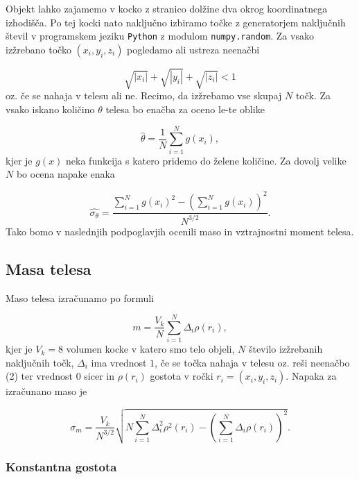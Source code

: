 \documentclass[slovene,11pt,a4paper]{article}
\begin{document}
Objekt lahko zajamemo v kocko z stranico dolžine dva okrog koordinatnega izhodišča. Po tej kocki nato naključno izbiramo točke z generatorjem naključnih števil v programskem jeziku \texttt{Python} z modulom \texttt{numpy.random}. Za vsako izžrebano točko $(x_i, y_i, z_i)$ pogledamo ali ustreza neenačbi

\begin{equation}
\sqrt{|x_i|} + \sqrt{|y_i|} + \sqrt{|z_i|} < 1
\end{equation}
oz. če se nahaja v telesu ali ne. Recimo, da izžrebamo vse skupaj $N$ točk. Za vsako iskano količino $\theta$ telesa bo enačba za oceno le-te oblike

\begin{equation}
\hat{\theta} = \frac{1}{N} \sum_{i=1}^N g(x_i),
\end{equation}
kjer je $g(x)$ neka funkcija s katero pridemo do želene količine. Za dovolj velike $N$ bo ocena napake enaka

\begin{equation}
\hat{\sigma_{\theta}} = \frac{\sum_{i=1}^N g(x_i)^2 - \left( \sum_{i=1}^N g(x_i) \right)^2}{N^{3/2}}.
\end{equation}
Tako bomo v naslednjih podpoglavjih ocenili maso in vztrajnostni moment telesa.

\subsection{Masa telesa}

Maso telesa izračunamo po formuli

\begin{equation}
m = \frac{V_k}{N} \sum_{i=1}^N \Delta_i \rho(r_i),
\end{equation}
kjer je $V_k = 8$ volumen kocke v katero smo telo objeli, $N$ število izžrebanih naključnih točk, $\Delta_i$ ima vrednost $1$, če se točka nahaja v telesu oz. reši neenačbo (2) ter vrednost $0$ sicer in $\rho(r_i)$ gostota v ročki $r_i = (x_i, y_i, z_i)$. Napaka za izračunano maso je

\begin{equation}
\sigma_m = \frac{V_k}{N^{3/2}} \sqrt{N\sum_{i=1}^N \Delta_i^2 \rho^2(r_i) - 
\left( \sum_{i=1}^N \Delta_i \rho(r_i) \right)^2}.
\end{equation}

\subsubsection{Konstantna gostota}
\end{document}
